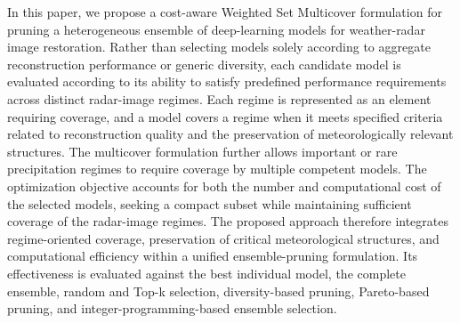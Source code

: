  In this paper, we propose a cost-aware Weighted Set Multicover formulation for pruning a heterogeneous ensemble of deep-learning models for weather-radar image restoration. Rather than selecting models solely according to aggregate reconstruction performance or generic diversity, each candidate model is evaluated according to its ability to satisfy predefined performance requirements across distinct radar-image regimes. Each regime is represented as an element requiring coverage, and a model covers a regime when it meets specified criteria related to reconstruction quality and the preservation of meteorologically relevant structures. The multicover formulation further allows important or rare precipitation regimes to require coverage by multiple competent models. The optimization objective accounts for both the number and computational cost of the selected models, seeking a compact subset while maintaining sufficient coverage of the radar-image regimes. The proposed approach therefore integrates regime-oriented coverage, preservation of critical meteorological structures, and computational efficiency within a unified ensemble-pruning formulation. Its effectiveness is evaluated against the best individual model, the complete ensemble, random and Top-k selection, diversity-based pruning, Pareto-based pruning, and integer-programming-based ensemble selection.